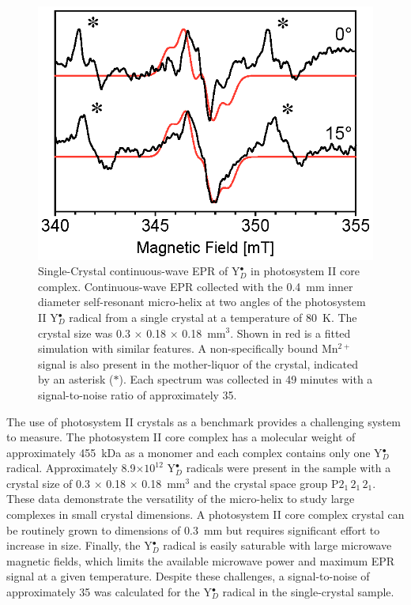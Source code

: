 \begin{figure}[htb]
\centering
 \includegraphics{Kapitel/Ch4-Images/03-PSII-xTal-Data.eps}
 \caption[Single-Crystal CW EPR of Y$_D^\bullet$ in the photosystem II core complex.]{Single-Crystal continuous-wave EPR of Y$_D^\bullet$ in photosystem II core complex. Continuous-wave EPR collected with the 0.4~mm inner diameter self-resonant micro-helix at two angles of the photosystem II Y$_D^\bullet$ radical from a single crystal at a temperature of 80~K. The crystal size was 0.3 $\times$ 0.18 $\times$ 0.18~mm$^3$. Shown in red is a fitted simulation with similar features. A non-specifically bound Mn$^{2+}$ signal is also present in the mother-liquor of the crystal, indicated by an asterisk (\mbox{\large $\ast$}). Each spectrum was collected in 49 minutes with a signal-to-noise ratio of approximately 35.}
 \label{fig:xTalPSII}
\end{figure}

The use of photosystem II crystals as a benchmark provides a challenging system to measure. The photosystem II core complex has a molecular weight of approximately 455~kDa as a monomer and each complex contains only one Y$_D^\bullet$ radical. Approximately 8.9$\times10^{12}$ Y$_D^\bullet$ radicals were present in the sample with a crystal size of 0.3 $\times$ 0.18 $\times$ 0.18~mm$^3$ and the crystal space group P${2_1\,2_1\,2_1}$. These data demonstrate the versatility of the micro-helix to study large complexes in small crystal dimensions. A photosystem II core complex crystal can be routinely grown to dimensions of 0.3~mm but requires significant effort to increase in size. Finally, the Y$_D^\bullet$ radical is easily saturable with large microwave magnetic fields, which limits the available microwave power and maximum EPR signal at a given temperature. Despite these challenges, a signal-to-noise of approximately 35 was calculated for the Y$_D^\bullet$ radical in the single-crystal sample. 

